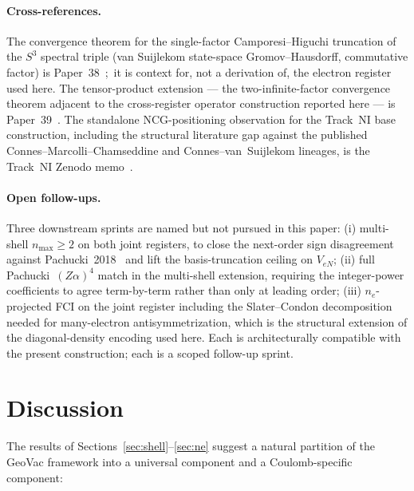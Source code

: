 \documentclass[twocolumn,prc,amsmath,amssymb,superscriptaddress]{revtex4-2}
\begin{document}
\paragraph{Cross-references.}
The convergence theorem for the single-factor Camporesi--Higuchi
truncation of the $S^3$ spectral triple (van Suijlekom state-space
Gromov--Hausdorff, commutative factor) is Paper~38~\cite{Paper38};\ it is
context for, not a derivation of, the electron register used here. The
tensor-product extension --- the two-infinite-factor convergence theorem
adjacent to the cross-register operator construction reported here --- is
Paper~39~\cite{Paper39}. The standalone NCG-positioning observation for
the Track~NI base construction, including the structural literature
gap against the published Connes--Marcolli--Chamseddine and
Connes--van~Suijlekom lineages, is the Track~NI Zenodo
memo~\cite{TrackNiZenodo}.

\paragraph{Open follow-ups.}
Three downstream sprints are named but not pursued in this paper:
(i) multi-shell $n_{\max} \geq 2$ on both joint registers, to close
the next-order sign disagreement against
Pachucki~2018~\cite{Pachucki2018} and lift the basis-truncation
ceiling on $V_{eN}$; (ii) full Pachucki~$(Z\alpha)^4$ match in the
multi-shell extension, requiring the integer-power coefficients to
agree term-by-term rather than only at leading order; (iii) $n_e$-projected
FCI on the joint register including the Slater--Condon decomposition
needed for many-electron antisymmetrization, which is the structural
extension of the diagonal-density encoding used here. Each is
architecturally compatible with the present construction; each is a
scoped follow-up sprint.

\section{Discussion}
\label{sec:discussion}

The results of Sections~\ref{sec:shell}--\ref{sec:ne} suggest a natural
partition of the GeoVac framework into a universal component and a
Coulomb-specific component:
\end{document}
